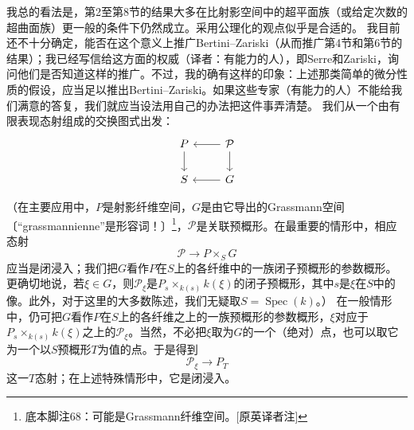 
我总的看法是，第2至第8节的结果大多在比射影空间中的超平面族（或给定次数的超曲面族）更一般的条件下仍然成立。采用公理化的观点似乎是合适的。
我目前还不十分确定，能否在这个意义上推广Bertini--Zariski（从而推广第4节和第6节的结果）；我已经写信给这方面的权威（译者：有能力的人），即Serre和Zariski，询问他们是否知道这样的推广。不过，我的确有这样的印象：上述那类简单的微分性质的假设，应当足以推出Bertini--Zariski。如果这些专家（有能力的人）不能给我们满意的答复，我们就应当设法用自己的办法把这件事弄清楚。
我们从一个由有限表现态射组成的交换图式出发：
\[
\begin{tikzcd}
P \arrow[d] & \mathcal P \arrow[l] \arrow[d] \\
S & G \arrow[l]
\end{tikzcd}
\]

（在主要应用中，$P$是射影纤维空间，$G$是由它导出的Grassmann空间〔“grassmannienne”是形容词！〕\footnote{底本脚注68：可能是Grassmann纤维空间。[原英译者注]}，$\mathcal P$是关联预概形。在最重要的情形中，相应态射
\[
\mathcal P\longrightarrow P\times_S G
\]
应当是闭浸入；我们把$G$看作$P$在$S$上的各纤维中的一族闭子预概形的参数概形。更确切地说，若$\xi\in G$，则$\mathcal P_\xi$是$P_s\times_{k(s)}k(\xi)$的闭子预概形，其中$s$是$\xi$在$S$中的像。此外，对于这里的大多数陈述，我们无疑取$S=\operatorname{Spec}(k)$。）
在一般情形中，仍可把$G$看作$P$在$S$上的各纤维之上的一族预概形的参数概形，$\xi$对应于$P_s\times_{k(s)}k(\xi)$之上的$\mathcal P_\xi$。当然，不必把$\xi$取为$G$的一个（绝对）点，也可以取它为一个以$S$预概形$T$为值的点。于是得到
\[
\mathcal P_\xi\longrightarrow P_T
\]
这一$T$态射；在上述特殊情形中，它是闭浸入。


